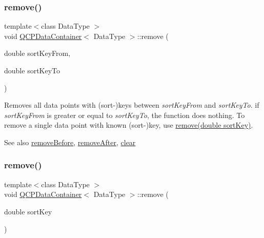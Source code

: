 \subsubsection{\texorpdfstring{remove()}{remove()}\hspace{0.1cm}{\footnotesize\ttfamily [1/2]}}
{\footnotesize\ttfamily template$<$class Data\+Type $>$ \\
void \hyperlink{class_q_c_p_data_container}{Q\+C\+P\+Data\+Container}$<$ Data\+Type $>$\+::remove (\begin{DoxyParamCaption}\item[{double}]{sort\+Key\+From,  }\item[{double}]{sort\+Key\+To }\end{DoxyParamCaption})}

Removes all data points with (sort-\/)keys between {\itshape sort\+Key\+From} and {\itshape sort\+Key\+To}. if {\itshape sort\+Key\+From} is greater or equal to {\itshape sort\+Key\+To}, the function does nothing. To remove a single data point with known (sort-\/)key, use \hyperlink{class_q_c_p_data_container_a2dbded7f0732bacf9db48fdfbbb620bc}{remove(double sort\+Key)}.

\begin{DoxySeeAlso}{See also}
\hyperlink{class_q_c_p_data_container_aa7f74cbce304b0369e1626c3798e1eda}{remove\+Before}, \hyperlink{class_q_c_p_data_container_abbe5d87ffc10b5aeffa5bb42cf03aa3c}{remove\+After}, \hyperlink{class_q_c_p_data_container_a7e2b29736c6fd761649bda1a54ba967f}{clear} 
\end{DoxySeeAlso}
\mbox{\label{class_q_c_p_data_container_a2dbded7f0732bacf9db48fdfbbb620bc}} 
\subsubsection{\texorpdfstring{remove()}{remove()}\hspace{0.1cm}{\footnotesize\ttfamily [2/2]}}
{\footnotesize\ttfamily template$<$class Data\+Type $>$ \\
void \hyperlink{class_q_c_p_data_container}{Q\+C\+P\+Data\+Container}$<$ Data\+Type $>$\+::remove (\begin{DoxyParamCaption}\item[{double}]{sort\+Key }\end{DoxyParamCaption})}

